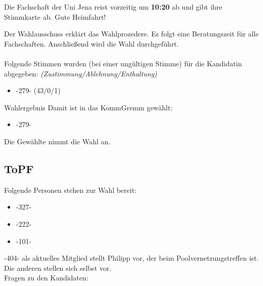    \begin{info}{}
      Die Fachschaft der Uni Jena reist vorzeitig um \textbf{10:20} ab und gibt ihre Stimmkarte ab. Gute Heimfahrt!
    \end{info}

    Der Wahlausschuss erklärt das Wahlprozedere.
    Es folgt eine Beratungszeit für alle Fachschaften. Anschließend wird die Wahl durchgeführt. \\ \\

    Folgende Stimmen wurden (bei einer ungültigen Stimme) für die Kandidatin abgegeben: \textit{(Zustimmung/Ablehnung/Enthaltung)}
    \begin{itemize}
      \item -279- (43/0/1)
    \end{itemize}

    \begin{success}{Wahlergebnis}
      Damit ist in das KommGremm gewählt:
      \begin{itemize}
        \item -279-
      \end{itemize}
      \tcblower
      Die Gewählte nimmt die Wahl an.
    \end{success}

  \subsection{ToPF}
    Folgende Personen stehen zur Wahl bereit:
    \begin{itemize}
      \item -327-
      \item -222-
      \item -101-
    \end{itemize}
    -404- als aktuelles Mitglied stellt Philipp vor, der beim Poolvernetzungstreffen ist. Die anderen stellen sich selbst vor. \\ Fragen zu den Kandidaten:

